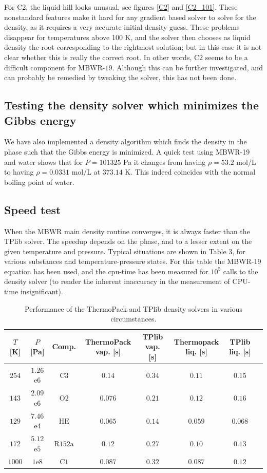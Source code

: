 \documentclass[internal,english]{sintefmemo2012}
\numberwithin{equation}{section}
\begin{document}
For C2, the liquid hill looks unusual, see figures \ref{C2} and \ref{C2_101}. These
nonstandard features make it hard for any gradient based solver to
solve for the density, as it requires a very accurate initial density
guess. These problems disappear for temperatures above 100 K, and the
solver then chooses as liquid density the root corresponding to the rightmost
solution; but in this case it is not clear whether this is really the
correct root. In other words, C$2$ seems to be a difficult component
for MBWR-$19$. Although this can be further investigated, and can
probably be remedied by tweaking the solver, this has not been done.

\subsection{Testing the density solver which minimizes the Gibbs energy}
We have also implemented a density algorithm which finds the density
in the phase such that the Gibbs energy is minimized. A quick test using MBWR-19 and water
shows that for $P = 101325$ Pa it changes from having $\rho = 53.2$ mol/L to having $\rho = 0.0331$ mol/L at $373.14$ K. This indeed coincides with the normal boiling point of water.

\subsection{Speed test}
When the MBWR main density routine converges, it is always faster than
the TPlib solver. The speedup depends on the phase, and to a lesser extent on the given temperature and pressure. Typical situations
are shown in Table 3, for various substances and temperature-pressure states. For this table the MBWR-19 equation has been used, and the cpu-time has been measured for $10^5$ calls to the density solver (to render the inherent inaccuracy in the measurement of CPU-time insignificant).

\begin{table}
  \label{MBWR19times}
  \centering
  \begin{tabular}{c c c c c c c c }
    $T$ [K]		        & $P$ [Pa]		& Comp.     & ThermoPack vap. [s] & TPlib vap. [s] & Thermopack liq. [s]  & TPlib liq. [s]  \\
    \hline
    $254$	        & $1.26$e$6$    &$\mathrm C 3$		&$0.14$            & $0.34$	 & $0.11$        &$0.15$	    \\
    $143$               & $2.09$e$6$  	&$\mathrm O2$		&$0.076$           & $0.21$	 & $0.12$     	  &$0.16$		        \\
    $129$	        & $7.46$e$4$   	&$\mathrm{HE}$		&$0.065$           & $0.14$	 & $0.059$    	  &$0.068$		            \\
    $172$               & $5.12$e$5$   	&$\mathrm R152 \mathrm a$	&$0.12$    & $0.27$	 & $0.10$    	  &$0.13$	        \\
    $1000$	        & $1$e$8$      	&$\mathrm C1$ 		&$0.087$            & $0.32$	 & $0.087$    	  &$0.12$	      \\         
  \end{tabular}
  \caption{Performance of the ThermoPack and TPlib density solvers in various circumstances.}
\end{table}
\end{document}
